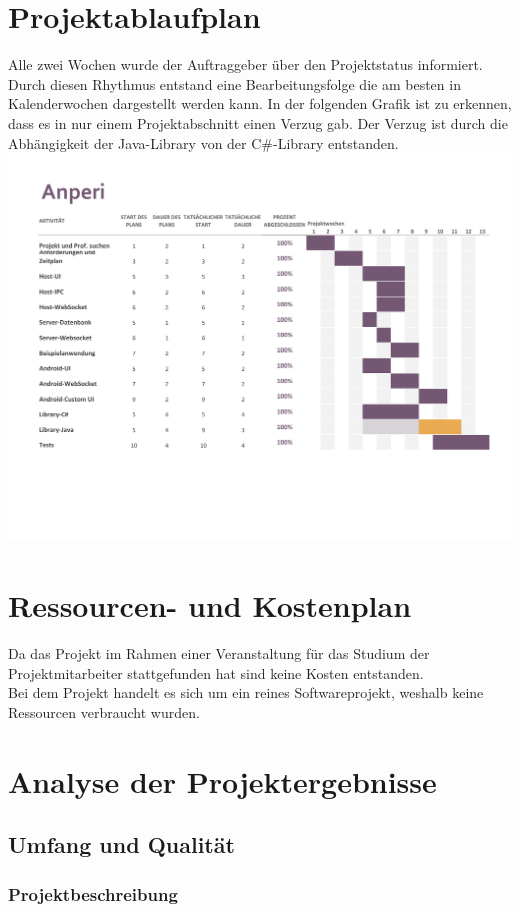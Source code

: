 \documentclass{scrartcl}
\begin{document}
\section{Projektablaufplan}
Alle zwei Wochen wurde der Auftraggeber über den Projektstatus informiert.
Durch diesen Rhythmus entstand eine Bearbeitungsfolge die am besten in Kalenderwochen dargestellt werden kann.
In der folgenden Grafik ist zu erkennen, dass es in nur einem Projektabschnitt einen Verzug gab. Der Verzug ist durch die Abhängigkeit der Java-Library von der C\#-Library entstanden.
\includegraphics[scale=0.65]{Projektablaufplan.pdf}

\section{Ressourcen- und Kostenplan}
Da das Projekt im Rahmen einer Veranstaltung für das Studium der Projektmitarbeiter stattgefunden hat sind keine Kosten entstanden. \\
Bei dem Projekt handelt es sich um ein reines Softwareprojekt, weshalb keine Ressourcen verbraucht wurden. 

\section{Analyse der Projektergebnisse}

\subsection{Umfang und Qualität}
\subsubsection{Projektbeschreibung}
\end{document}
